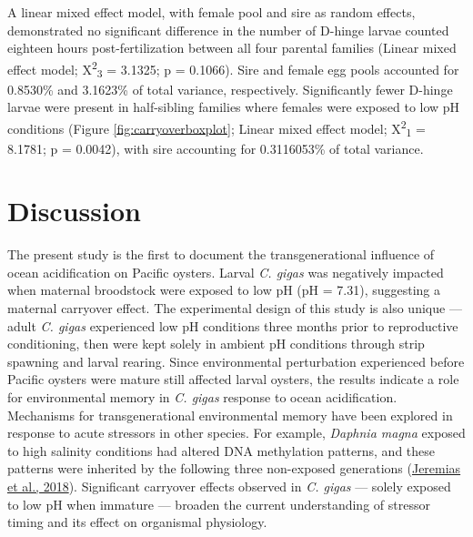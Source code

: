 \documentclass [11pt, proquest] {uwthesis}[2015/03/03]
\begin{document}
A linear mixed effect model, with female pool and sire as random effects, demonstrated no significant difference in the number of D-hinge larvae counted eighteen hours post-fertilization between all four parental families (Linear mixed effect model; X\textsuperscript{2}\textsubscript{3} = 3.1325; p = 0.1066). Sire and female egg pools accounted for 0.8530\% and 3.1623\% of total variance, respectively. Significantly fewer D-hinge larvae were present in half-sibling families where females were exposed to low pH conditions (Figure \ref{fig:carryoverboxplot}; Linear mixed effect model; X\textsuperscript{2}\textsubscript{1} = 8.1781; p = 0.0042), with sire accounting for 0.3116053\% of total variance.

\hypertarget{discussion-1}{%
\section{Discussion}\label{discussion-1}}

The present study is the first to document the transgenerational influence of ocean acidification on Pacific oysters. Larval \emph{C. gigas} was negatively impacted when maternal broodstock were exposed to low pH (pH = 7.31), suggesting a maternal carryover effect. The experimental design of this study is also unique --- adult \emph{C. gigas} experienced low pH conditions three months prior to reproductive conditioning, then were kept solely in ambient pH conditions through strip spawning and larval rearing. Since environmental perturbation experienced before Pacific oysters were mature still affected larval oysters, the results indicate a role for environmental memory in \emph{C. gigas} response to ocean acidification. Mechanisms for transgenerational environmental memory have been explored in response to acute stressors in other species. For example, \emph{Daphnia magna} exposed to high salinity conditions had altered DNA methylation patterns, and these patterns were inherited by the following three non-exposed generations (\protect\hyperlink{ref-Jeremias2018}{Jeremias et al., 2018}). Significant carryover effects observed in \emph{C. gigas} --- solely exposed to low pH when immature --- broaden the current understanding of stressor timing and its effect on organismal physiology.
\end{document}
